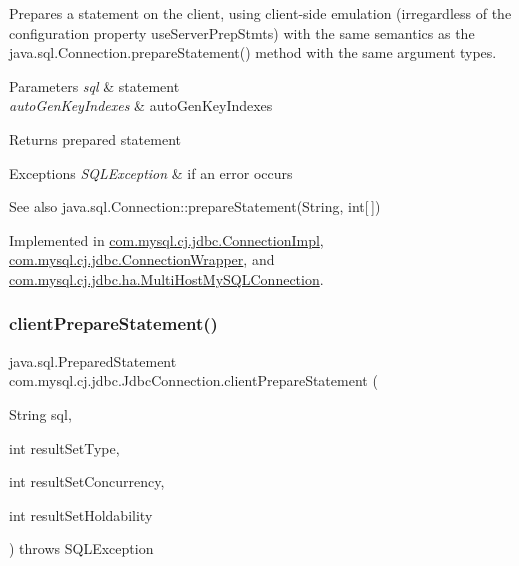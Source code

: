 Prepares a statement on the client, using client-\/side emulation (irregardless of the configuration property \textquotesingle{}use\+Server\+Prep\+Stmts\textquotesingle{}) with the same semantics as the java.\+sql.\+Connection.\+prepare\+Statement() method with the same argument types.


\begin{DoxyParams}{Parameters}
{\em sql} & statement \\
\hline
{\em auto\+Gen\+Key\+Indexes} & auto\+Gen\+Key\+Indexes \\
\hline
\end{DoxyParams}
\begin{DoxyReturn}{Returns}
prepared statement 
\end{DoxyReturn}

\begin{DoxyExceptions}{Exceptions}
{\em S\+Q\+L\+Exception} & if an error occurs\\
\hline
\end{DoxyExceptions}
\begin{DoxySeeAlso}{See also}
java.\+sql.\+Connection\+::prepare\+Statement(\+String, int\mbox{[}$\,$\mbox{]}) 
\end{DoxySeeAlso}


Implemented in \mbox{\hyperlink{classcom_1_1mysql_1_1cj_1_1jdbc_1_1_connection_impl_aec5834ec5d7244d13cefd58333b3c553}{com.\+mysql.\+cj.\+jdbc.\+Connection\+Impl}}, \mbox{\hyperlink{classcom_1_1mysql_1_1cj_1_1jdbc_1_1_connection_wrapper_a1fc94fe8ebcc323191215f63aad419ff}{com.\+mysql.\+cj.\+jdbc.\+Connection\+Wrapper}}, and \mbox{\hyperlink{classcom_1_1mysql_1_1cj_1_1jdbc_1_1ha_1_1_multi_host_my_s_q_l_connection_ac3338beff85b1b1704e87f67b643eeaa}{com.\+mysql.\+cj.\+jdbc.\+ha.\+Multi\+Host\+My\+S\+Q\+L\+Connection}}.

\mbox{\label{interfacecom_1_1mysql_1_1cj_1_1jdbc_1_1_jdbc_connection_a802cf843e62a0feac95a16c7750a35c3}} 
\subsubsection{\texorpdfstring{client\+Prepare\+Statement()}{clientPrepareStatement()}\hspace{0.1cm}{\footnotesize\ttfamily [5/6]}}
{\footnotesize\ttfamily java.\+sql.\+Prepared\+Statement com.\+mysql.\+cj.\+jdbc.\+Jdbc\+Connection.\+client\+Prepare\+Statement (\begin{DoxyParamCaption}\item[{String}]{sql,  }\item[{int}]{result\+Set\+Type,  }\item[{int}]{result\+Set\+Concurrency,  }\item[{int}]{result\+Set\+Holdability }\end{DoxyParamCaption}) throws S\+Q\+L\+Exception}

